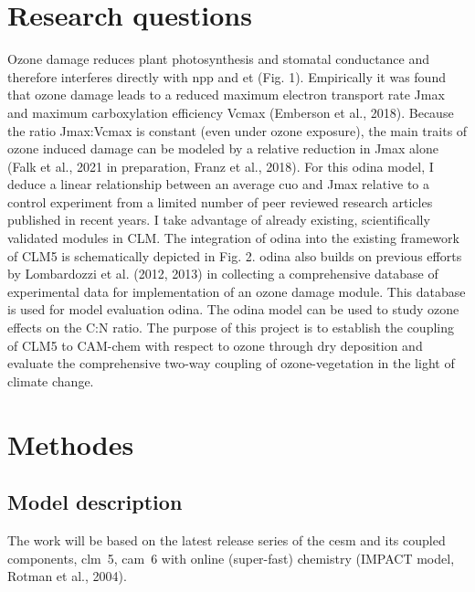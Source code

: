 \documentclass[11pt, a4paper, oneside, article]{memoir}
\begin{document}
\chapter{Research questions}
Ozone damage reduces plant photosynthesis and stomatal conductance and therefore interferes directly with \gls{npp} and \gls{et} (Fig. 1). Empirically it was found that ozone damage leads to a reduced maximum electron transport rate Jmax and maximum carboxylation efficiency Vcmax (Emberson et al., 2018). Because the ratio Jmax:Vcmax is constant (even under ozone exposure), the main traits of ozone induced damage can be modeled by a relative reduction in Jmax alone (Falk et al., 2021 in preparation, Franz et al., 2018). For this \gls{odina} model, I deduce a linear relationship between an average \gls{cuo} and Jmax relative to a control experiment from a limited number of peer reviewed research articles published in recent years. I take advantage of already existing, scientifically validated modules in CLM. The integration of \gls{odina} into the existing framework of CLM5 is schematically depicted in Fig. 2. \gls{odina} also builds on previous efforts by Lombardozzi et al. (2012, 2013) in collecting a comprehensive database of experimental data for implementation of an ozone damage module. This database is used for model evaluation \gls{odina}. The \gls{odina} model can be used to study ozone effects on the C:N ratio. The purpose of this project is to establish the coupling of CLM5 to CAM-chem with respect to ozone through dry deposition and evaluate the comprehensive two-way coupling of ozone-vegetation in the light of climate change.

\chapter{Methodes}
\section*{Model description}
The work will be based on the latest release series of the \gls{cesm} and its coupled components, \gls{clm}~5, \gls{cam}~6 with online (super-fast) chemistry (IMPACT model, Rotman et al., 2004).
\end{document}
